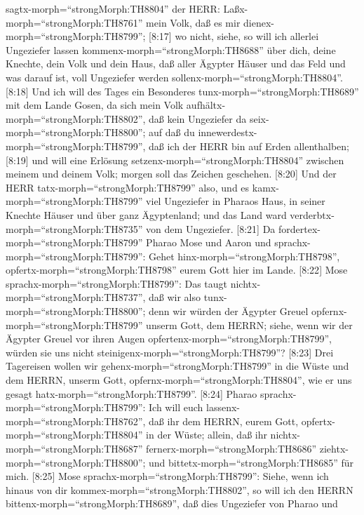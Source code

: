 sagtx-morph=``strongMorph:TH8804'' der HERR:
Laßx-morph=``strongMorph:TH8761'' mein Volk, daß es mir
dienex-morph=``strongMorph:TH8799'';  {[}8:17{]} wo nicht,
siehe, so will ich allerlei Ungeziefer lassen
kommenx-morph=``strongMorph:TH8688'' über dich, deine Knechte, dein Volk
und dein Haus, daß aller Ägypter Häuser und das Feld und was darauf ist,
voll Ungeziefer werden sollenx-morph=``strongMorph:TH8804''.
 {[}8:18{]} Und ich will des Tages ein Besonderes
tunx-morph=``strongMorph:TH8689'' mit dem Lande Gosen, da sich mein Volk
aufhältx-morph=``strongMorph:TH8802'', daß kein Ungeziefer da
seix-morph=``strongMorph:TH8800''; auf daß du
innewerdestx-morph=``strongMorph:TH8799'', daß ich der HERR bin auf
Erden allenthalben;  {[}8:19{]} und will eine Erlösung
setzenx-morph=``strongMorph:TH8804'' zwischen meinem und deinem Volk;
morgen soll das Zeichen geschehen.  {[}8:20{]} Und der HERR
tatx-morph=``strongMorph:TH8799'' also, und es
kamx-morph=``strongMorph:TH8799'' viel Ungeziefer in Pharaos Haus, in
seiner Knechte Häuser und über ganz Ägyptenland; und das Land ward
verderbtx-morph=``strongMorph:TH8735'' von dem Ungeziefer. 
{[}8:21{]} Da fordertex-morph=``strongMorph:TH8799'' Pharao Mose und
Aaron und sprachx-morph=``strongMorph:TH8799'': Gehet
hinx-morph=``strongMorph:TH8798'', opfertx-morph=``strongMorph:TH8798''
eurem Gott hier im Lande.  {[}8:22{]} Mose
sprachx-morph=``strongMorph:TH8799'': Das taugt
nichtx-morph=``strongMorph:TH8737'', daß wir also
tunx-morph=``strongMorph:TH8800''; denn wir würden der Ägypter Greuel
opfernx-morph=``strongMorph:TH8799'' unserm Gott, dem HERRN; siehe, wenn
wir der Ägypter Greuel vor ihren Augen
opfertenx-morph=``strongMorph:TH8799'', würden sie uns nicht
steinigenx-morph=``strongMorph:TH8799''?  {[}8:23{]} Drei
Tagereisen wollen wir gehenx-morph=``strongMorph:TH8799'' in die Wüste
und dem HERRN, unserm Gott, opfernx-morph=``strongMorph:TH8804'', wie er
uns gesagt hatx-morph=``strongMorph:TH8799''.  {[}8:24{]}
Pharao sprachx-morph=``strongMorph:TH8799'': Ich will euch
lassenx-morph=``strongMorph:TH8762'', daß ihr dem HERRN, eurem Gott,
opfertx-morph=``strongMorph:TH8804'' in der Wüste; allein, daß ihr
nichtx-morph=``strongMorph:TH8687'' fernerx-morph=``strongMorph:TH8686''
ziehtx-morph=``strongMorph:TH8800''; und
bittetx-morph=``strongMorph:TH8685'' für mich.  {[}8:25{]}
Mose sprachx-morph=``strongMorph:TH8799'': Siehe, wenn ich hinaus von
dir kommex-morph=``strongMorph:TH8802'', so will ich den HERRN
bittenx-morph=``strongMorph:TH8689'', daß dies Ungeziefer von Pharao und

